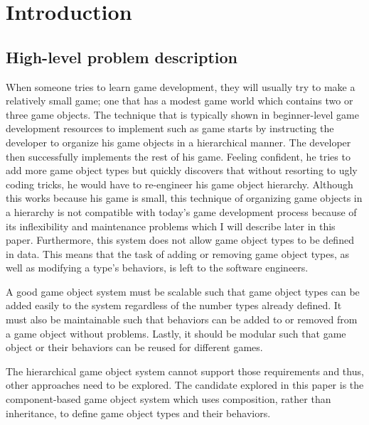 \documentclass[
    phd,
    electronic,
    letterpaper,
    simplechapterheading,
    openany,
    parttop,
    lof,
]{byumsphd}
\title{\Title}
\author{\Author}
\begin{document}
\maketitle
{}



\chapter{Introduction}



\section{High-level problem description}

When someone tries to learn game development, they will usually try to make a relatively small game; one that has a modest game world which contains two or three game objects. The technique that is typically shown in beginner-level game development resources to implement such as game starts by instructing the developer to organize his game objects in a hierarchical manner. The developer then successfully implements the rest of his game. Feeling confident, he tries to add more game object types but quickly discovers that without resorting to ugly coding tricks, he would have to re-engineer his game object hierarchy. Although this works because his game is small,  this technique of organizing game objects in a hierarchy is not compatible with today's game development process because of its inflexibility and maintenance problems which I will describe later in this paper. Furthermore, this system does not allow game object types to be defined in data. This means that the task of adding or removing game object types, as well as modifying a type's behaviors, is left to the software engineers.

A good game object system must be scalable such that game object types can be added easily to the system regardless of the number types already defined. It must also be maintainable such that behaviors can be added to or removed from a game object without problems. Lastly, it should be modular such that game object or their behaviors can be reused for different games.

The hierarchical game object system cannot support those requirements and thus, other approaches need to be explored. The candidate explored in this paper is the component-based game object system which uses composition, rather than inheritance, to define game object types and their behaviors.
\end{document}
